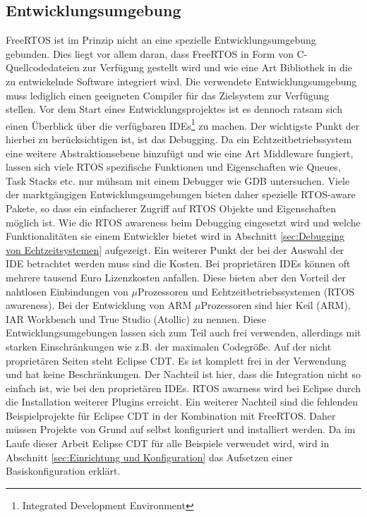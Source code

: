 \subsection{Entwicklungsumgebung}
\label{ref:Entwicklungsumgebung}
FreeRTOS ist im Prinzip nicht an eine spezielle Entwicklungsumgebung gebunden. Dies liegt vor allem daran, dass FreeRTOS in Form von C-Quellcodedateien zur Verfügung gestellt wird und wie eine Art Bibliothek in die zu entwickelnde Software integriert wird. Die verwendete Entwicklungsumgebung muss lediglich einen geeigneten Compiler für das Zielsystem zur Verfügung stellen. Vor dem Start eines Entwicklungsprojektes ist es dennoch ratsam sich einen Überblick über die ver\-fügbaren IDEs\footnote{Integrated Development Environment} zu machen. Der wichtigste Punkt der hierbei zu berücksichtigen ist, ist das Debugging. Da ein Echtzeitbetriebssystem eine weitere Abstraktionsebene hinzufügt und wie eine Art Middleware fungiert, lassen sich viele RTOS spezifische Funktionen und Eigenschaften wie Queues, Task Stacks etc. nur mühsam mit einem Debugger wie GDB untersuchen. Viele der markt\-gäng\-igen Entwicklungsumgebungen bieten daher spezielle RTOS-aware Pakete, so dass ein einfacherer Zugriff auf RTOS Objekte und Eigenschaften möglich ist. Wie die RTOS awareness beim Debugging eingesetzt wird und welche Funktionalitäten sie einem Entwickler bietet wird in Abschnitt \ref{sec:Debugging von Echtzeitsystemen} aufgezeigt. Ein weiterer Punkt der bei der Auswahl der IDE betrachtet werden muss sind die Kosten. Bei proprietären IDEs können oft mehrere tausend Euro Lizenzkosten anfallen. Diese bieten aber den Vorteil der nahtlosen Einbindungen von $\mu$Prozessoren und Echtzeitbetriebssystemen (RTOS awareness). Bei der Entwicklung von ARM $\mu$\-Prozessoren sind hier Keil (ARM), IAR Workbench und True Studio (Atollic) zu nennen. Diese Entwicklungsumgebungen lassen sich zum Teil auch frei verwenden, allerdings mit starken Einschränkungen wie z.B. der maximalen Codegröße. Auf der nicht proprietären Seiten steht Eclipse CDT. Es ist komplett frei in der Verwendung und hat keine Beschränkungen. Der Nachteil ist hier, dass die Integration nicht so einfach ist, wie bei den proprietären IDEs. RTOS awarness wird bei Eclipse durch die Installation weiterer Plugins erreicht. Ein weiterer Nachteil sind die fehlenden Beispielprojekte für Eclipse CDT in der Kombination mit FreeRTOS. Daher müssen Projekte von Grund auf selbst konfiguriert und installiert werden. Da im Laufe dieser Arbeit Eclipse CDT für alle Beispiele verwendet wird, wird in Abschnitt \ref{sec:Einrichtung und Konfiguration} das Aufsetzen einer Basiskonfiguration erklärt.